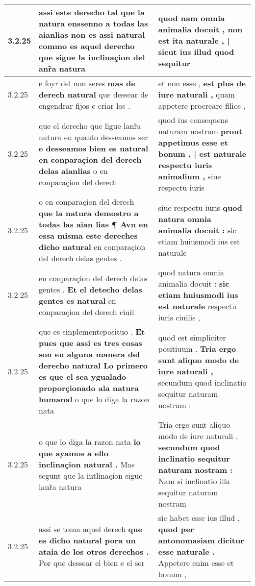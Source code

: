 \begin{tabular}{|p{1cm}|p{6.5cm}|p{6.5cm}|}
3.2.25 & assi este derecho tal que la natura enssenno a todas las aianlias non es \textbf{ assi natural commo es aquel derecho } que sigue la inclinaçion del anr̃a natura & quod nam omnia animalia docuit , \textbf{ non est ita naturale , | sicut ius illud } quod sequitur \\\hline
3.2.25 & e foyr del non seres \textbf{ mas de derech natural } que dessear de engendrar fijos e criar los . & et non esse , \textbf{ est plus de iure naturali , } quam appetere procreare filios , \\\hline
3.2.25 & que el derecho que ligue lanr̃a natura en quanto desseamos ser \textbf{ e desseamos bien es natural en conparaçion del derech delas aianlias } o en conparaçion del derech & quod ius consequens naturam nostram \textbf{ prout appetimus esse et bonum , | est naturale respectu iuris animalium , } siue respectu iuris \\\hline
3.2.25 & o en conparaçion del derech \textbf{ que la natura demostro a todas las aian lias ¶ Avn en essa misma este dereches dicho natural } en conparaçion del derech delas gentes . & siue respectu iuris \textbf{ quod natura omnia animalia docuit : } sic etiam huiusmodi ius est naturale \\\hline
3.2.25 & en conparaçion del derech delas gentes . \textbf{ Et el detecho delas gentes es natural } en conparaçion del derech ciuil & quod natura omnia animalia docuit : \textbf{ sic etiam huiusmodi ius est naturale } respectu iuris ciuilis , \\\hline
3.2.25 & que es sinplementeposituo . \textbf{ Et pues que assi es tres cosas son en alguna manera del derecho natural Lo primero es que el sea ygualado proporçionado ala natura humanal } o que lo diga la razon nata & quod est simpliciter positiuum . \textbf{ Tria ergo sunt aliquo modo de iure naturali , } secundum quod inclinatio sequitur naturam nostram : \\\hline
3.2.25 & o que lo diga la razon nata \textbf{ lo que ayamos a ello inclinaçion natural . } Mas segunt que la intlinaçion sigue lanr̃a natura & Tria ergo sunt aliquo modo de iure naturali , \textbf{ secundum quod inclinatio sequitur naturam nostram : } Nam si inclinatio illa sequitur naturam nostram \\\hline
3.2.25 & assi se toma aquel derech \textbf{ que es dicho natural pora un ataia de los otros derechos . } Por que dessear el bien e el ser & sic habet esse ius illud , \textbf{ quod per antonomasiam dicitur esse naturale . } Appetere enim esse et bonum , \\\hline

\end{tabular}
